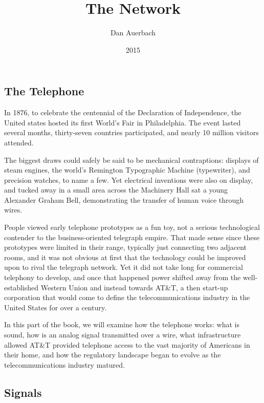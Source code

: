 \documentclass[UTF8]{book}
\begin{document}
\begin{CJK}{UTF8}{gbsn}

\title{The Network}
\author{Dan Auerbach}
\date{2015}
\maketitle

\part{The Telephone}

In 1876, to celebrate the centennial of the Declaration of Independence, the United states hosted its first World's Fair in Philadelphia. The event lasted several months, thirty-seven countries participated, and nearly 10 million visitors attended.

The biggest draws could safely be said to be mechanical contraptions: displays of steam engines, the world's Remington Typographic Machine (typewriter), and precision watches, to name a few. Yet electrical inventions were also on display, and tucked away in a small area across the Machinery Hall sat a young Alexander Graham Bell, demonstrating the transfer of human voice through wires.

People viewed early telephone prototypes as a fun toy, not a serious technological contender to the business-oriented telegraph empire. That made sense since these prototypes were limited in their range, typically just connecting two adjacent rooms, and it was not obvious at first that the technology could be improved upon to rival the telegraph network. Yet it did not take long for commercial telephony to develop, and once that happened power shifted away from the well-established Western Union and instead towards AT\&T, a then start-up corporation that would come to define the telecommunications industry in the United States for over a century.

In this part of the book, we will examine how the telephone works: what is sound, how is an analog signal transmitted over a wire, what infrastructure allowed AT\&T provided telephone access to the vast majority of Americans in their home, and how the regulatory landscape began to evolve as the telecommunications industry matured.

\chapter{Signals}


\end{CJK}
\end{document}

